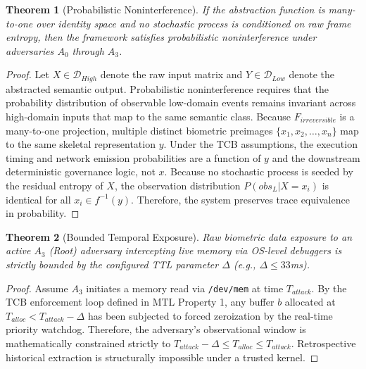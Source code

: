 \documentclass[conference]{IEEEtran}
\newtheorem{theorem}{Theorem}
\begin{document}
\begin{theorem}[Probabilistic Noninterference]
If the abstraction function is many-to-one over identity space and no stochastic process is conditioned on raw frame entropy, then the framework satisfies probabilistic noninterference under adversaries $A_0$ through $A_3$.
\end{theorem}
\begin{proof}
Let $X \in \mathcal{D}_{High}$ denote the raw input matrix and $Y \in \mathcal{D}_{Low}$ denote the abstracted semantic output. Probabilistic noninterference requires that the probability distribution of observable low-domain events remains invariant across high-domain inputs that map to the same semantic class. Because $F_{irreversible}$ is a many-to-one projection, multiple distinct biometric preimages $\{x_1, x_2, \dots, x_n\}$ map to the same skeletal representation $y$. Under the TCB assumptions, the execution timing and network emission probabilities are a function of $y$ and the downstream deterministic governance logic, not $x$. Because no stochastic process is seeded by the residual entropy of $X$, the observation distribution $P(obs_L | X = x_i)$ is identical for all $x_i \in f^{-1}(y)$. Therefore, the system preserves trace equivalence in probability.
\end{proof}

\begin{theorem}[Bounded Temporal Exposure]
Raw biometric data exposure to an active $A_3$ (Root) adversary intercepting live memory via OS-level debuggers is strictly bounded by the configured TTL parameter $\Delta$ (e.g., $\Delta \le 33$ms).
\end{theorem}
\begin{proof}
Assume $A_3$ initiates a memory read via \texttt{/dev/mem} at time $T_{attack}$. By the TCB enforcement loop defined in MTL Property 1, any buffer $b$ allocated at $T_{alloc} < T_{attack} - \Delta$ has been subjected to forced zeroization by the real-time priority watchdog. Therefore, the adversary's observational window is mathematically constrained strictly to $T_{attack} - \Delta \le T_{alloc} \le T_{attack}$. Retrospective historical extraction is structurally impossible under a trusted kernel.
\end{proof}
\end{document}
